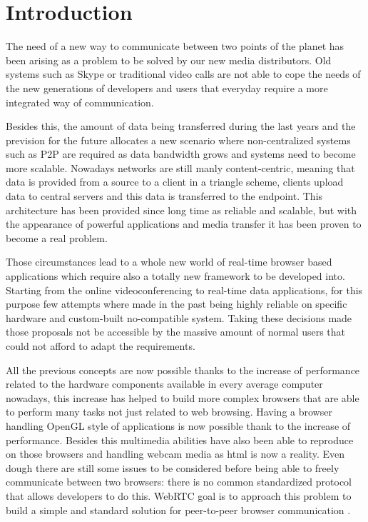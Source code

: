 \section{Introduction}

\thispagestyle{empty}

The need of a new way to communicate between two points of the planet has been arising as a problem to be solved by our new media distributors. Old systems such as Skype or traditional video calls are not able to cope the needs of the new generations of developers and users that everyday require a more integrated way of communication. 

Besides this, the amount of data being transferred during the last years and the prevision for the future allocates a new scenario where non-centralized systems such as P2P are required as data bandwidth grows and systems need to become more scalable. Nowadays networks are still manly content-centric, meaning that data is provided from a source to a client in a triangle scheme, clients upload data to central servers and this data is transferred to the endpoint. This architecture has been provided since long time as reliable and scalable, but with the appearance of powerful applications and media transfer it has been proven to become a real problem.

Those circumstances lead to a whole new world of real-time browser based applications which require also a totally new framework to be developed into. Starting from the online videoconferencing to real-time data applications, for this purpose few attempts where made in the past being highly reliable on specific hardware and custom-built no-compatible system. Taking these decisions made those proposals not be accessible by the massive amount of normal users that could not afford to adapt the requirements. 

All the previous concepts are now possible thanks to the increase of performance related to the hardware components available in every 
average computer nowadays, this increase has helped to build more complex browsers that are able to perform many tasks not just related 
to web browsing. Having a browser handling OpenGL style of applications is now possible thank to the increase of performance. Besides this multimedia abilities have also been able to reproduce on those browsers and handling webcam media as html is now a reality. Even dough there are still some issues to be considered before being able to freely communicate between two browsers: there is no common standardized protocol that allows developers to do this. WebRTC goal is to approach this problem to build a simple and standard solution for peer-to-peer browser communication \cite{alvestrandOverview2012}.

